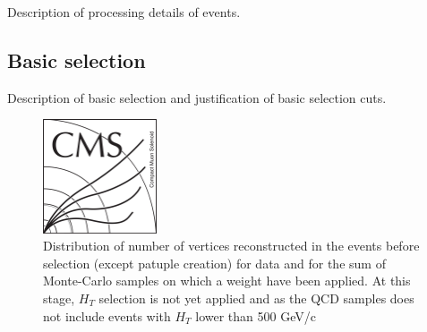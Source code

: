 Description of processing details of events.

\subsection{Basic selection}

Description of basic selection and justification of basic selection cuts.

\begin{figure}[!Hhtbp]
  \begin{center}
    \includegraphics[width=0.3\textwidth]{figs/CMSlogo.png}
    \caption{Distribution of number of vertices reconstructed in the events before selection (except patuple creation) for data and for the sum of Monte-Carlo samples on which a weight have been applied.  At this stage, $H_T$ selection is not yet applied and as the QCD samples does not include events with $H_T$ lower than 500 GeV/c}
    \label{fig:Nvtcs}
  \end{center}
\end{figure}\clearpage

